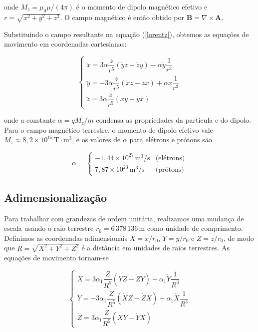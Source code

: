 \documentclass[twocolumn]{rbef}
\begin{document}
\noindent onde $M_z = \mu_0 \mu / (4\pi)$ é o momento de dipolo magnético efetivo e $r = \sqrt{x^2 + y^2 + z^2}$. O campo magnético é então obtido por $\boldsymbol{B} = \nabla \times \boldsymbol{A}$.

Substituindo o campo resultante na equação (\ref{lorentz}), obtemos as equações de movimento em coordenadas cartesianas:

\begin{equation}\label{eqCartesianas}
    \begin{cases}
    \ddot{x} = 3\alpha\dfrac{z}{r^5}\left(\dot{y}z - \dot{z}y\right) - \alpha\dot{y}\dfrac{1}{r^3}\\[8pt]
    \ddot{y} = -3\alpha\dfrac{z}{r^5}\left(\dot{x}z - \dot{z}x\right) + \alpha\dot{x}\dfrac{1}{r^3}\\[8pt]
    \ddot{z} = 3\alpha\dfrac{z}{r^5}\left(\dot{x}y - \dot{y}x\right)
    \end{cases}
\end{equation}

\noindent onde a constante $\alpha = qM_z/m$ condensa as propriedades da partícula e do dipolo. Para o campo magnético terrestre, o momento de dipolo efetivo vale $M_z \approx 8{,}2 \times 10^{15}\,\text{T}\cdot\text{m}^3$, e os valores de $\alpha$ para elétrons e prótons são

\begin{equation}
    \alpha = \begin{cases}
                -1{,}44 \times 10^{27}\,\text{m}^3/\text{s} & \textrm{(elétrons)}\\[4pt]
                7{,}87 \times 10^{23}\,\text{m}^3/\text{s} & \textrm{(prótons)}
            \end{cases}
\end{equation}

\subsection{Adimensionalização}

Para trabalhar com grandezas de ordem unitária, realizamos uma mudança de escala usando o raio terrestre $r_0 = 6\,378\,136\,\text{m}$ como unidade de comprimento. Definimos as coordenadas adimensionais $X = x/r_0$, $Y = y/r_0$ e $Z = z/r_0$, de modo que $R = \sqrt{X^2 + Y^2 + Z^2}$ é a distância em unidades de raios terrestres. As equações de movimento tornam-se

\begin{equation}\label{eqAdimensional}
    \begin{cases}
    \ddot{X} = 3\alpha_1\dfrac{Z}{R^5}\left(\dot{Y}Z - \dot{Z}Y\right) - \alpha_1\dot{Y}\dfrac{1}{R^3}\\[8pt]
    \ddot{Y} = -3\alpha_1\dfrac{Z}{R^5}\left(\dot{X}Z - \dot{Z}X\right) + \alpha_1\dot{X}\dfrac{1}{R^3}\\[8pt]
    \ddot{Z} = 3\alpha_1\dfrac{Z}{R^5}\left(\dot{X}Y - \dot{Y}X\right)
    \end{cases}
\end{equation}
\end{document}
